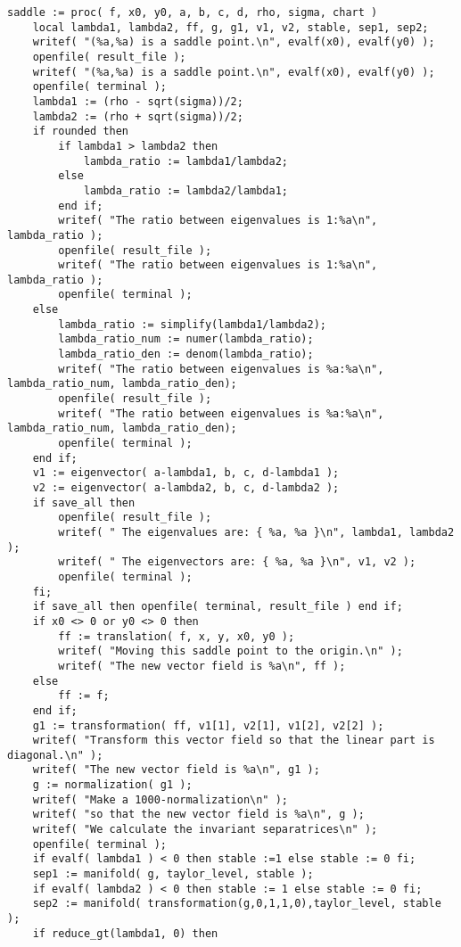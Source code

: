 \documentclass[a4paper,10pt]{article}
\begin{document}
\begin{lstlisting}[name=type]
saddle := proc( f, x0, y0, a, b, c, d, rho, sigma, chart )
    local lambda1, lambda2, ff, g, g1, v1, v2, stable, sep1, sep2;
    writef( "(%a,%a) is a saddle point.\n", evalf(x0), evalf(y0) );
    openfile( result_file );
    writef( "(%a,%a) is a saddle point.\n", evalf(x0), evalf(y0) );
    openfile( terminal );
    lambda1 := (rho - sqrt(sigma))/2;
    lambda2 := (rho + sqrt(sigma))/2;
    if rounded then
        if lambda1 > lambda2 then
            lambda_ratio := lambda1/lambda2;
        else
            lambda_ratio := lambda2/lambda1;
        end if;
        writef( "The ratio between eigenvalues is 1:%a\n", lambda_ratio );
        openfile( result_file );
        writef( "The ratio between eigenvalues is 1:%a\n", lambda_ratio );
        openfile( terminal );
    else
        lambda_ratio := simplify(lambda1/lambda2);
        lambda_ratio_num := numer(lambda_ratio);
        lambda_ratio_den := denom(lambda_ratio);
        writef( "The ratio between eigenvalues is %a:%a\n", lambda_ratio_num, lambda_ratio_den);
        openfile( result_file );
        writef( "The ratio between eigenvalues is %a:%a\n", lambda_ratio_num, lambda_ratio_den);
        openfile( terminal );
    end if;
    v1 := eigenvector( a-lambda1, b, c, d-lambda1 );
    v2 := eigenvector( a-lambda2, b, c, d-lambda2 );
    if save_all then
        openfile( result_file );
        writef( " The eigenvalues are: { %a, %a }\n", lambda1, lambda2 );
        writef( " The eigenvectors are: { %a, %a }\n", v1, v2 );
        openfile( terminal );
    fi;
    if save_all then openfile( terminal, result_file ) end if;
    if x0 <> 0 or y0 <> 0 then
        ff := translation( f, x, y, x0, y0 );
        writef( "Moving this saddle point to the origin.\n" );
        writef( "The new vector field is %a\n", ff );
    else
        ff := f;
    end if;
    g1 := transformation( ff, v1[1], v2[1], v1[2], v2[2] );
    writef( "Transform this vector field so that the linear part is diagonal.\n" );
    writef( "The new vector field is %a\n", g1 );
    g := normalization( g1 );
    writef( "Make a 1000-normalization\n" );
    writef( "so that the new vector field is %a\n", g );
    writef( "We calculate the invariant separatrices\n" );
    openfile( terminal );
    if evalf( lambda1 ) < 0 then stable :=1 else stable := 0 fi;
    sep1 := manifold( g, taylor_level, stable );
    if evalf( lambda2 ) < 0 then stable := 1 else stable := 0 fi;
    sep2 := manifold( transformation(g,0,1,1,0),taylor_level, stable );
    if reduce_gt(lambda1, 0) then

\end{lstlisting}
\end{document}

